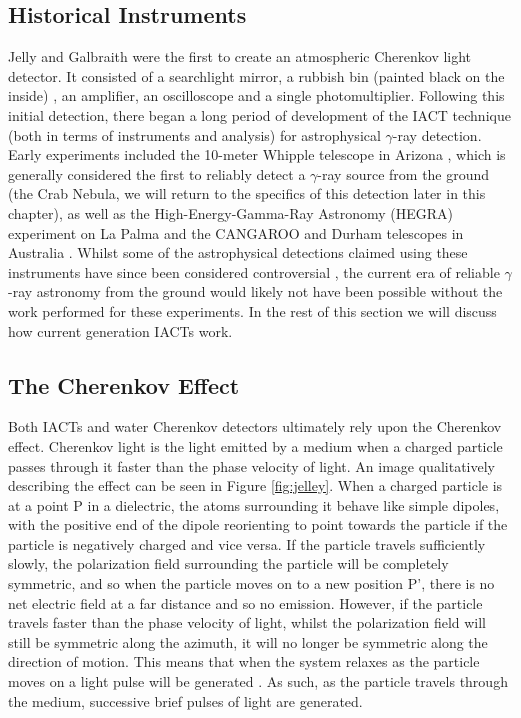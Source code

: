 \subsection{Historical Instruments}
Jelly and Galbraith \cite{G+J} were the first to create an atmospheric Cherenkov light detector. It consisted of a searchlight mirror, a rubbish bin (painted black on the inside) , an amplifier, an oscilloscope and a single photomultiplier. Following this initial detection, there began a long period of development of the IACT technique (both in terms of instruments and analysis) for astrophysical $\gamma$-ray detection. Early experiments included the 10-meter Whipple telescope in Arizona \cite{whipple}, which is generally considered the first to reliably detect a $\gamma$-ray source from the ground (the Crab Nebula, we will return to the specifics of this detection later in this chapter), as well as the High-Energy-Gamma-Ray Astronomy (HEGRA) experiment on La Palma \cite{HEGRA} and the CANGAROO and Durham telescopes in Australia \cite{CANGAROO} \cite{DURHAM}. Whilst some of the astrophysical detections claimed using these instruments have since been considered controversial \cite{hintonicrc30}, the current era of reliable $\gamma$-ray astronomy from the ground would likely not have been possible without the work performed for these experiments. In the rest of this section we will discuss how current generation IACTs work. 

\subsection{The Cherenkov Effect}
Both IACTs and water Cherenkov detectors ultimately rely upon the Cherenkov effect. Cherenkov light is the light emitted by a medium when a charged particle passes through it faster than the phase velocity of light. An image qualitatively describing the effect can be seen in Figure \ref{fig:jelley}. When a charged particle is at a point P in a dielectric, the atoms surrounding it behave like simple dipoles, with the positive end of the dipole reorienting to point towards the particle if the particle is negatively charged and vice versa. If the particle travels sufficiently slowly, the polarization field surrounding the particle will be completely symmetric, and so when the particle moves on to a new position P', there is no net electric field at a far distance and so no emission. However, if the particle travels faster than the phase velocity of light, whilst the polarization field will still be symmetric along the azimuth, it will no longer be symmetric along the direction of motion. This means that when the system relaxes as the particle moves on a light pulse will be generated \cite{jelley}. As such, as the particle travels through the medium, successive brief pulses of light are generated. 

